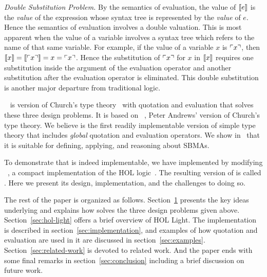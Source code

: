 \documentclass[fleqn]{llncs}
\begin{document}
  \item \emph{Double Substitution Problem.}  By the semantics of
    evaluation, the value of $\llbracket e\rrbracket$ is the \emph{value} of the
    expression whose syntax tree is represented by the \emph{value} of
    $e$.  Hence the semantics of evaluation involves a double
    valuation.  This is most apparent when the value of a variable
    involves a syntax tree which refers to the name of that same
    variable. For example, if
    the value of a variable $x$ is $\ulcorner x\urcorner$, then
    $\llbracket x\rrbracket = \llbracket\ulcorner x\urcorner\rrbracket = x = \ulcorner x\urcorner$.
    Hence the substitution of $\ulcorner x\urcorner$ for $x$ in $\llbracket x\rrbracket$
    requires one substitution inside the argument of the evaluation
    operator and another substitution after the evaluation operator is
    eliminated.  This double substitution is another major departure
    from traditional logic.

\ee

{\churchqe}~\cite{FarmerArxiv16,Farmer16} is version of Church's type
theory~\cite{Church40} with quotation and evaluation that solves these
three design problems.  It is based on {\qzero}~\cite{Andrews02},
Peter Andrews' version of Church's type theory.  We believe
{\churchqe} is the first readily implementable version of simple type
theory that includes \emph{global} quotation and evaluation operators.  We
show in~\cite{FarmerArxiv16} that it is suitable for defining,
applying, and reasoning about SBMAs.

To demonstrate that {\churchqe} is indeed implementable, we have
implemented {\churchqe} by modifying \HL~\cite{Harrison09}, a
compact implementation of the HOL logic~\cite{GordonMelham93}.  The
resulting version of \HL{} is called \HLQE.  Here we present its
design, implementation, and the challenges to doing so.

The rest of the paper is organized as follows.
Section~\ref{sec:ctt-qe} presents the key ideas underlying {\churchqe}
and explains how {\churchqe} solves the three design problems given
above.  Section~\ref{sec:hol-light} offers a brief overview of HOL
Light.  The \HLQE{} implementation is described in
section~\ref{sec:implementation}, and examples of how quotation and
evaluation are used in it are discussed in section~\ref{sec:examples}.
Section~\ref{sec:related-work} is devoted to related work.  And the
paper ends with some final remarks in section~\ref{sec:conclusion}
including a brief discussion on future work.

\section{\churchqe}\label{sec:ctt-qe}
\end{document}

